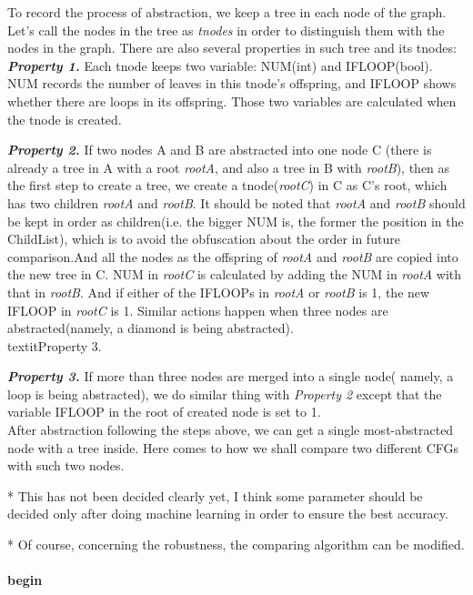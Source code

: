 \documentclass[12pt]{article}
\begin{document}
To record the process of abstraction, we keep a tree in each node of the graph. Let's call the nodes in the tree as \textit{tnodes} in order to distinguish them with the nodes in the graph. There are also several properties in such tree and its tnodes:\\

\textbf{\textit{Property 1.}} Each tnode keeps two variable: NUM(int) and IFLOOP(bool). NUM records the number of leaves in this tnode's offspring, and IFLOOP shows whether there are loops in its offspring.  Those two variables are calculated when the tnode is created.\

\textbf{\textit{Property 2.}} If two nodes A and B are abstracted into one node C (there is already a tree in A with a root \textit{rootA}, and also a tree in B with \textit{rootB}), then as the first step to create a tree, we create a tnode(\textit{rootC}) in C as C's root, which has two children \textit{rootA} and \textit{rootB}. It should be noted that \textit{rootA} and \textit{rootB} should be kept in order as children(i.e. the bigger NUM is, the former the position in the ChildList), which is to avoid the obfuscation about the order in future comparison.And all the nodes as the offspring of \textit{rootA} and \textit{rootB} are copied into the new tree in C. NUM in \textit{rootC} is calculated by adding the NUM in \textit{rootA} with that in \textit{rootB}. And if either of the IFLOOPs in \textit{rootA} or \textit{rootB} is 1, the new IFLOOP in \textit{rootC} is 1. Similar actions happen when three nodes are abstracted(namely, a diamond is being abstracted).\\textit{Property 3.}

\textbf{\textit{Property 3.}} If more than three nodes are merged into a single node( namely, a loop is being abstracted),  we do similar thing with \textit{Property 2} except that the variable IFLOOP in the root of created node is set to 1.\\

After abstraction following the steps above, we can get a single most-abstracted node with a tree inside. Here comes to how we shall compare two different CFGs with such two nodes.\

* This has not been decided clearly yet, I think some parameter should be decided only after doing machine learning in order to ensure the best accuracy.\

* Of course, concerning the robustness, the comparing algorithm can be modified.\\
\\
\textbf{begin}\
\end{document}
